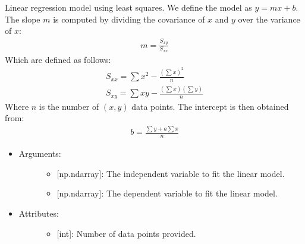 \documentclass[letterpaper,10pt,english]{sphinxmanual}
\begin{document}
\begin{fulllineitems}
\label{\detokenize{models:data_tools.models.Linear}}
Linear regression model using least squares. We define the model as
\(y=mx+b\). The slope \(m\) is computed by dividing the
covariance of \(x\) and \(y\) over the variance of
\(x\):
\begin{equation*}
\begin{split}m=\frac{S_{xy}}{S_{xx}}\end{split}
\end{equation*}
Which are defined as follows:
\begin{equation*}
\begin{split}S_{xx}=\sum x^2-\frac{(\sum x)^2}{n}\\
S_{xy}=\sum xy-\frac{(\sum x)(\sum y)}{n}\end{split}
\end{equation*}
Where \(n\) is the number of \((x,y)\) data points. The
intercept is then obtained from:
\begin{equation*}
\begin{split}b=\frac{\sum y+a\sum x}{n}\end{split}
\end{equation*}\begin{itemize}
\item {} \begin{description}
\item[{Arguments:}] \leavevmode\begin{itemize}
\item {} 
 {[}np.ndarray{]}: The independent variable to fit the linear
model.

\item {} 
 {[}np.ndarray{]}: The dependent variable to fit the linear
model.

\end{itemize}

\end{description}

\item {} \begin{description}
\item[{Attributes:}] \leavevmode\begin{itemize}
\item {} 
 {[}int{]}: Number of data points provided.


\end{itemize}
\end{description}
\end{itemize}
\end{fulllineitems}
\end{document}
